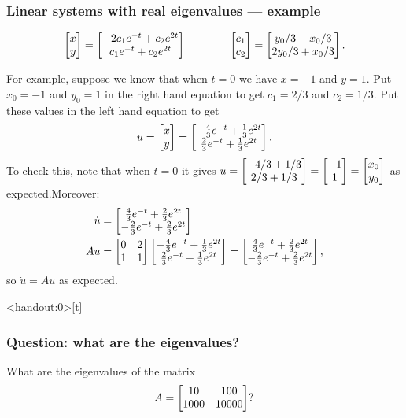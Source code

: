 \documentclass[9pt]{beamer}
\begin{document}
\begin{frame}[t]
 \frametitle{Linear systems with real eigenvalues --- example}

 \[ \left[\begin{matrix} x \\ y \end{matrix}\right] = 
    \left[\begin{matrix} -2c_1e^{-t} + c_2e^{2t} \\
         c_1e^{-t} + c_2e^{2t} \end{matrix}\right]
    \hspace{4em}
    \left[\begin{matrix} c_1 \\ c_2 \end{matrix}\right] = 
    \left[\begin{matrix} y_0/3 - x_0/3 \\ 2y_0/3 + x_0/3 \end{matrix}\right].
 \]

 \reminderbar

 For example, suppose we know that when $t=0$ we have $x=-1$ and
 $y=1$.  \pause
 Put $x_0=-1$ and $y_0=1$ in the right hand equation to get 
 $c_1=2/3$ and $c_2=1/3$. \pause
 Put these values in the left hand equation to get 
 \[ u = \left[\begin{matrix} x \\ y \end{matrix}\right] = 
      \left[\begin{matrix} -\frac{4}{3}e^{-t} + \frac{1}{3}e^{2t} \\
           \frac{2}{3}e^{-t} + \frac{1}{3}e^{2t} \end{matrix}\right].
 \] \pause
 To check this, note that when $t=0$ it gives 
 $u=\left[\begin{matrix} -4/3 + 1/3 \\ 2/3 + 1/3\end{matrix}\right] = \left[\begin{matrix} -1 \\ 1\end{matrix}\right] = \left[\begin{matrix} x_0\\y_0\end{matrix}\right]$
 as expected.\pause  Moreover:
 \begin{align*}
  \dot{u} &= \left[\begin{matrix}  \frac{4}{3}e^{-t} + \frac{2}{3}e^{2t} \\
                  -\frac{2}{3}e^{-t} + \frac{2}{3}e^{2t} \end{matrix}\right] \\
  Au &= \left[\begin{matrix} 0 & 2 \\ 1 & 1 \end{matrix}\right] 
        \left[\begin{matrix} -\frac{4}{3}e^{-t} + \frac{1}{3}e^{2t} \\
              \frac{2}{3}e^{-t} + \frac{1}{3}e^{2t} \end{matrix}\right] 
      = \left[\begin{matrix}  \frac{4}{3}e^{-t} + \frac{2}{3}e^{2t} \\
             -\frac{2}{3}e^{-t} + \frac{2}{3}e^{2t} \end{matrix}\right], 
 \end{align*}
 so $\dot{u}=Au$ as expected.
\end{frame}


\begin{frame}<handout:0>[t]
 \frametitle{Question: what are the eigenvalues?}
 
 What are the eigenvalues of the matrix
 \[ A = \left[\begin{matrix} 10 & 100 \\ 1000 & 10000 \end{matrix}\right]? \]
 \bigskip


 \medskip

\end{frame}
\end{document}
